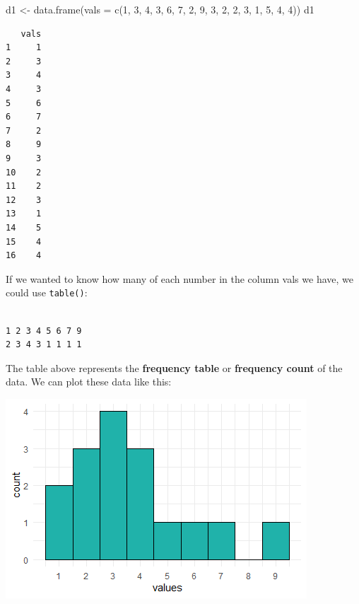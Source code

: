 \documentclass[
  letterpaper,
  DIV=11,
  numbers=noendperiod]{scrreprt}
\newenvironment{Shaded}{\begin{snugshade}}{\end{snugshade}}
\newcommand{\AttributeTok}[1]{\textcolor[rgb]{0.40,0.45,0.13}{#1}}
\newcommand{\DecValTok}[1]{\textcolor[rgb]{0.68,0.00,0.00}{#1}}
\newcommand{\FunctionTok}[1]{\textcolor[rgb]{0.28,0.35,0.67}{#1}}
\newcommand{\NormalTok}[1]{\textcolor[rgb]{0.00,0.23,0.31}{#1}}
\newcommand{\OtherTok}[1]{\textcolor[rgb]{0.00,0.23,0.31}{#1}}
\newcommand{\SpecialCharTok}[1]{\textcolor[rgb]{0.37,0.37,0.37}{#1}}
\begin{document}
\begin{Shaded}
\begin{Highlighting}[]
\NormalTok{d1 }\OtherTok{\textless{}{-}} \FunctionTok{data.frame}\NormalTok{(}\AttributeTok{vals =} \FunctionTok{c}\NormalTok{(}\DecValTok{1}\NormalTok{, }\DecValTok{3}\NormalTok{, }\DecValTok{4}\NormalTok{, }\DecValTok{3}\NormalTok{, }\DecValTok{6}\NormalTok{, }\DecValTok{7}\NormalTok{, }\DecValTok{2}\NormalTok{, }\DecValTok{9}\NormalTok{, }\DecValTok{3}\NormalTok{, }\DecValTok{2}\NormalTok{, }\DecValTok{2}\NormalTok{, }\DecValTok{3}\NormalTok{, }\DecValTok{1}\NormalTok{, }\DecValTok{5}\NormalTok{, }\DecValTok{4}\NormalTok{, }\DecValTok{4}\NormalTok{))}
\NormalTok{d1}
\end{Highlighting}
\end{Shaded}

\begin{verbatim}
   vals
1     1
2     3
3     4
4     3
5     6
6     7
7     2
8     9
9     3
10    2
11    2
12    3
13    1
14    5
15    4
16    4
\end{verbatim}

If we wanted to know how many of each number in the column vals we have,
we could use \texttt{table()}:

\begin{Shaded}
\end{Shaded}

\begin{verbatim}

1 2 3 4 5 6 7 9 
2 3 4 3 1 1 1 1 
\end{verbatim}

The table above represents the \textbf{frequency table} or
\textbf{frequency count} of the data. We can plot these data like this:

\includegraphics{./img/hist1.png}
\end{document}
